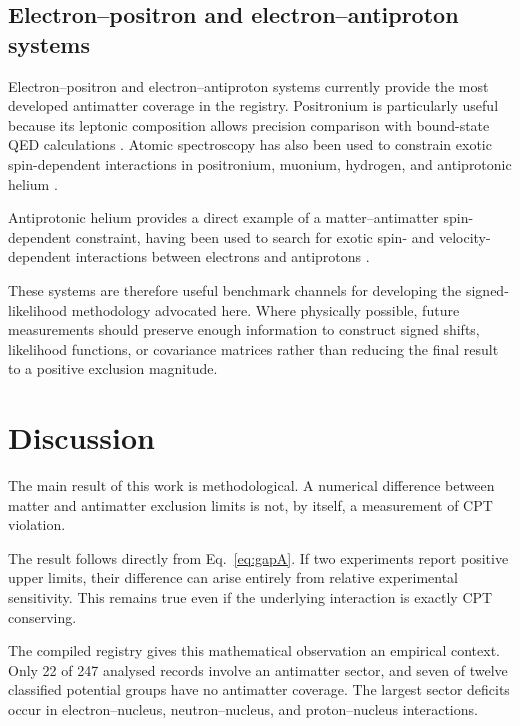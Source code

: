 \documentclass[aps,prd,reprint,superscriptaddress,nofootinbib]{revtex4-2}
\begin{document}
	\subsection{Electron--positron and electron--antiproton systems}
	
	Electron--positron and electron--antiproton systems currently provide
	the most developed antimatter coverage in the registry. Positronium is
	particularly useful because its leptonic composition allows precision
	comparison with bound-state QED calculations \cite{Adkins2022}.
	Atomic spectroscopy has also been used to constrain exotic
	spin-dependent interactions in positronium, muonium, hydrogen, and
	antiprotonic helium \cite{Fadeev2022}.
	
	Antiprotonic helium provides a direct example of a matter--antimatter
	spin-dependent constraint, having been used to search for exotic
	spin- and velocity-dependent interactions between electrons and
	antiprotons \cite{Ficek2018}.
	
	These systems are therefore useful benchmark channels for developing
	the signed-likelihood methodology advocated here. Where physically
	possible, future measurements should preserve enough information to
	construct signed shifts, likelihood functions, or covariance matrices
	rather than reducing the final result to a positive exclusion magnitude.
	
	\section{Discussion}
	
	The main result of this work is methodological. A numerical difference
	between matter and antimatter exclusion limits is not, by itself, a
	measurement of CPT violation.
	
	The result follows directly from Eq.~\eqref{eq:gapA}. If two experiments
	report positive upper limits, their difference can arise entirely from
	relative experimental sensitivity. This remains true even if the
	underlying interaction is exactly CPT conserving.
	
	The compiled registry gives this mathematical observation an empirical
	context. Only 22 of 247 analysed records involve an antimatter sector, and seven of twelve classified potential groups have no antimatter coverage. The largest sector deficits occur in electron--nucleus,
	neutron--nucleus, and proton--nucleus interactions.
	
\end{document}
